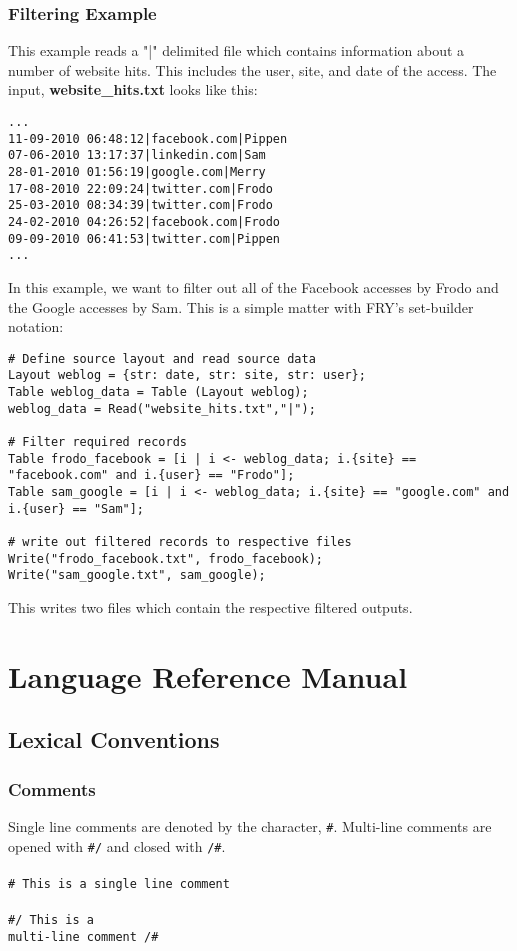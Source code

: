\documentclass{article}
\begin{document}
\subsubsection{Filtering Example}
\label{sec:filt_example}
This example reads a "|" delimited file which contains information about a number of website hits. This includes the user, site, and date of the access. The input, \textbf{website\_hits.txt} looks like this:
\begin{lstlisting}
...
11-09-2010 06:48:12|facebook.com|Pippen
07-06-2010 13:17:37|linkedin.com|Sam
28-01-2010 01:56:19|google.com|Merry
17-08-2010 22:09:24|twitter.com|Frodo
25-03-2010 08:34:39|twitter.com|Frodo
24-02-2010 04:26:52|facebook.com|Frodo
09-09-2010 06:41:53|twitter.com|Pippen
...
\end{lstlisting}
In this example, we want to filter out all of the Facebook accesses by Frodo and the Google accesses by Sam. This is a simple matter with FRY's set-builder notation:
\begin{lstlisting}
# Define source layout and read source data
Layout weblog = {str: date, str: site, str: user};
Table weblog_data = Table (Layout weblog);
weblog_data = Read("website_hits.txt","|");

# Filter required records
Table frodo_facebook = [i | i <- weblog_data; i.{site} == "facebook.com" and i.{user} == "Frodo"];
Table sam_google = [i | i <- weblog_data; i.{site} == "google.com" and i.{user} == "Sam"];

# write out filtered records to respective files
Write("frodo_facebook.txt", frodo_facebook);
Write("sam_google.txt", sam_google);
\end{lstlisting}
This writes two files which contain the respective filtered outputs.
\section{Language Reference Manual}
\subsection{Lexical Conventions}

\subsubsection{Comments}
Single line comments are denoted by the character, \texttt{\#}. Multi-line comments are opened with \texttt{\#/} and closed with \texttt{/\#}. 
\\
\\
\texttt{\# This is a single line comment}
\\
\\
\texttt{\#/ This is a 
\\
				multi-line comment /\#}
\end{document}
